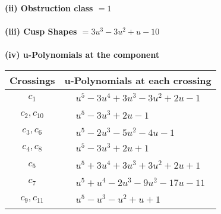 \documentclass[1p]{elsarticle_modified}
\theoremstyle{definition}
\begin{document}
\flushleft \textbf{(ii) Obstruction class $= 1$}\\~\\
\flushleft \textbf{(iii) Cusp Shapes $= 3 u^3-3 u^2+u-10$}\\~\\
\newpage\renewcommand{\arraystretch}{1}
\flushleft \textbf{(iv) u-Polynomials at the component}\newline \\
\begin{tabular}{m{50pt}|m{274pt}}
Crossings & \hspace{64pt}u-Polynomials at each crossing \\
\hline $$\begin{aligned}c_{1}\end{aligned}$$&$\begin{aligned}
&u^5-3 u^4+3 u^3-3 u^2+2 u-1
\end{aligned}$\\
\hline $$\begin{aligned}c_{2},c_{10}\end{aligned}$$&$\begin{aligned}
&u^5-3 u^3+2 u-1
\end{aligned}$\\
\hline $$\begin{aligned}c_{3},c_{6}\end{aligned}$$&$\begin{aligned}
&u^5-2 u^3-5 u^2-4 u-1
\end{aligned}$\\
\hline $$\begin{aligned}c_{4},c_{8}\end{aligned}$$&$\begin{aligned}
&u^5-3 u^3+2 u+1
\end{aligned}$\\
\hline $$\begin{aligned}c_{5}\end{aligned}$$&$\begin{aligned}
&u^5+3 u^4+3 u^3+3 u^2+2 u+1
\end{aligned}$\\
\hline $$\begin{aligned}c_{7}\end{aligned}$$&$\begin{aligned}
&u^5+u^4-2 u^3-9 u^2-17 u-11
\end{aligned}$\\
\hline $$\begin{aligned}c_{9},c_{11}\end{aligned}$$&$\begin{aligned}
&u^5- u^3- u^2+u+1
\end{aligned}$\\
\hline
\end{tabular}\\~\\
\end{document}
